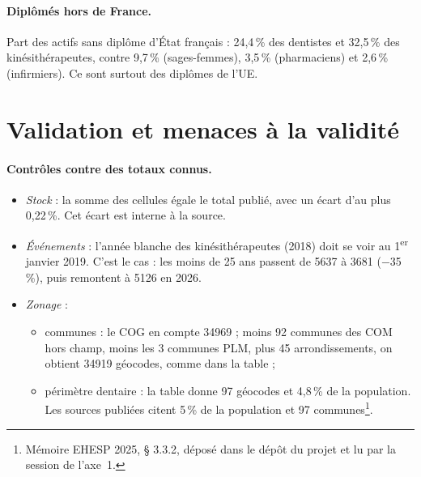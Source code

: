 \paragraph{Diplômés hors de France.} Part des actifs sans diplôme d'État français\mesure{} : 24,4\,\% des
dentistes et 32,5\,\% des kinésithérapeutes, contre 9,7\,\% (sages-femmes), 3,5\,\% (pharmaciens) et
2,6\,\% (infirmiers). Ce sont surtout des diplômes de l'UE.

\section{Validation et menaces à la validité}\label{a4-sec:menaces}
\paragraph{Contrôles contre des totaux connus.}
\begin{itemize}
  \item \emph{Stock} : la somme des cellules égale le total publié, avec un écart d'au plus 0,22\,\%\mesure{}.
  Cet écart est interne à la source.
  \item \emph{Événements} : l'année blanche des kinésithérapeutes (2018) doit se voir au 1\textsuperscript{er}
  janvier 2019. C'est le cas : les moins de 25 ans passent de \num{5637} à \num{3681} (\num{-35}\,\%), puis
  remontent à \num{5126} en 2026\mesure{}.
  \item \emph{Zonage} :
  \begin{itemize}
    \item communes : le COG en compte \num{34969} ; moins 92 communes des COM hors champ, moins les 3 communes
    PLM, plus 45 arrondissements, on obtient \num{34919} géocodes, comme dans la table\mesure{} ;
    \item périmètre dentaire : la table donne 97 géocodes et 4,8\,\% de la population\mesure{}. Les sources
    publiées citent 5\,\% de la population \citep{a4-arspaca2025cd} et 97 communes\footnote{Mémoire EHESP 2025,
    § 3.3.2, déposé dans le dépôt du projet et lu par la session de l'axe~1.}.
  \end{itemize}
\end{itemize}

